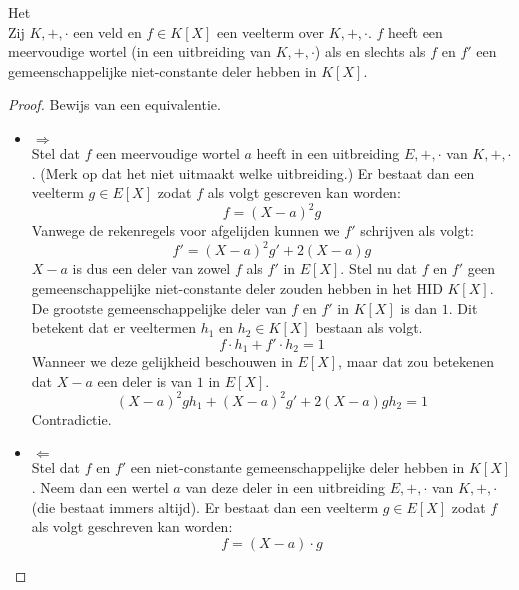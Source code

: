 \documentclass[main.tex]{subfiles}
\begin{document}
\begin{st}
  \label{st:criterium-meervoudige-wortel}
  Het \\
  Zij $K,+,\cdot$ een veld en $f\in K[X]$ een veelterm over $K,+,\cdot$.
  $f$ heeft een meervoudige wortel (in een uitbreiding van $K,+,\cdot$) als en slechts als $f$ en $f'$ een gemeenschappelijke niet-constante deler hebben in $K[X]$.

  \begin{proof}
    Bewijs van een equivalentie.
    \begin{itemize}
    \item $\Rightarrow$\\
      Stel dat $f$ een meervoudige wortel $a$ heeft in een uitbreiding $E,+,\cdot$ van $K,+,\cdot$. (Merk op dat het niet uitmaakt welke uitbreiding.)
      Er bestaat dan een veelterm $g\in E[X]$ zodat $f$ als volgt gescreven kan worden:
      \[ f = (X-a)^{2}g \]
      Vanwege de rekenregels voor afgelijden kunnen we $f'$ schrijven als volgt:
      \[ f' = (X-a)^{2}g' + 2(X-a)g \]
      $X-a$ is dus een deler van zowel $f$ als $f'$ in $E[X]$.
      Stel nu dat $f$ en $f'$ geen gemeenschappelijke niet-constante deler zouden hebben in het HID $K[X]$.
      De grootste gemeenschappelijke deler van $f$ en $f'$ in $K[X]$ is dan $1$.
      Dit betekent dat er veeltermen $h_{1}$ en $h_{2}\in K[X]$ bestaan als volgt.
      \[ f\cdot h_{1}+ f'\cdot h_{2} = 1 \]
      Wanneer we deze gelijkheid beschouwen in $E[X]$, maar dat zou betekenen dat $X-a$ een deler is van $1$ in $E[X]$. 
      \[ (X-a)^{2}gh_{1} + (X-a)^{2}g' + 2(X-a)gh_{2} = 1 \]
      Contradictie.
    \item $\Leftarrow$\\
      Stel dat $f$ en $f'$ een niet-constante gemeenschappelijke deler hebben in $K[X]$.
      Neem dan een wertel $a$ van deze deler in een uitbreiding $E,+,\cdot$ van $K,+,\cdot$ (die bestaat immers altijd).
      Er bestaat dan een veelterm $g\in E[X]$ zodat $f$ als volgt geschreven kan worden:
      \[ f=(X-a)\cdot g\]
    \end{itemize}
  \end{proof}
\end{st}
\end{document}
